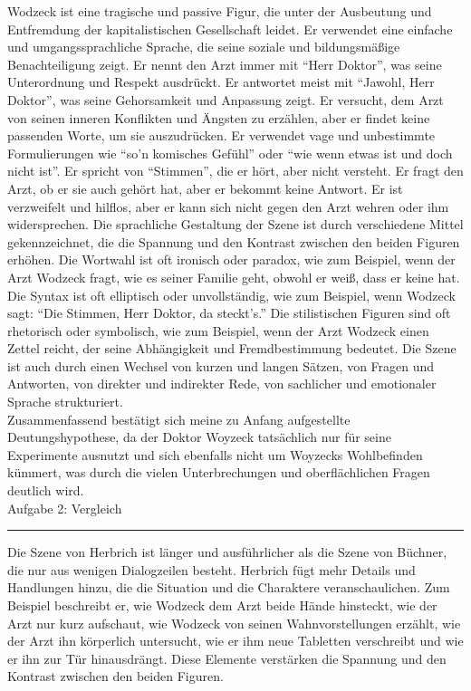 \documentclass[a4paper,12pt]{report}
\begin{document}
	Wodzeck ist eine tragische und passive Figur, die unter der Ausbeutung und Entfremdung der kapitalistischen Gesellschaft leidet.
	Er verwendet eine einfache und umgangssprachliche Sprache, die seine soziale und bildungsmäßige Benachteiligung zeigt.
	Er nennt den Arzt immer mit “Herr Doktor”, was seine Unterordnung und Respekt ausdrückt.
	Er antwortet meist mit “Jawohl, Herr Doktor”, was seine Gehorsamkeit und Anpassung zeigt.
	Er versucht, dem Arzt von seinen inneren Konflikten und Ängsten zu erzählen, aber er findet keine passenden Worte, um sie auszudrücken.
	Er verwendet vage und unbestimmte Formulierungen wie “so’n komisches Gefühl” oder “wie wenn etwas ist und doch nicht ist”.
	Er spricht von “Stimmen”, die er hört, aber nicht versteht.
	Er fragt den Arzt, ob er sie auch gehört hat, aber er bekommt keine Antwort.
	Er ist verzweifelt und hilflos, aber er kann sich nicht gegen den Arzt wehren oder ihm widersprechen.
	Die sprachliche Gestaltung der Szene ist durch verschiedene Mittel gekennzeichnet, die die Spannung und den Kontrast zwischen den beiden Figuren erhöhen.
	Die Wortwahl ist oft ironisch oder paradox, wie zum Beispiel, wenn der Arzt Wodzeck fragt, wie es seiner Familie geht, obwohl er weiß, dass er keine hat.
	Die Syntax ist oft elliptisch oder unvollständig, wie zum Beispiel, wenn Wodzeck sagt: “Die Stimmen, Herr Doktor, da steckt’s.”
	Die stilistischen Figuren sind oft rhetorisch oder symbolisch, wie zum Beispiel, wenn der Arzt Wodzeck einen Zettel reicht, der seine Abhängigkeit und Fremdbestimmung bedeutet.
	Die Szene ist auch durch einen Wechsel von kurzen und langen Sätzen, von Fragen und Antworten, von direkter und indirekter Rede, von sachlicher und emotionaler Sprache strukturiert.
	\\
	Zusammenfassend bestätigt sich meine zu Anfang aufgestellte Deutungshypothese, da der Doktor Woyzeck tatsächlich nur für seine Experimente ausnutzt und sich ebenfalls nicht um Woyzecks Wohlbefinden kümmert, was durch die vielen Unterbrechungen und oberflächlichen Fragen deutlich wird.
	\\[2cm]
	\Large
	Aufgabe 2: Vergleich
	\hrule
	\vspace{0.5cm}
	\noindent
	\large
	Die Szene von Herbrich ist länger und ausführlicher als die Szene von Büchner, die nur aus wenigen Dialogzeilen besteht. Herbrich fügt mehr Details und Handlungen hinzu, die die Situation und die Charaktere veranschaulichen. Zum Beispiel beschreibt er, wie Wodzeck dem Arzt beide Hände hinsteckt, wie der Arzt nur kurz aufschaut, wie Wodzeck von seinen Wahnvorstellungen erzählt, wie der Arzt ihn körperlich untersucht, wie er ihm neue Tabletten verschreibt und wie er ihn zur Tür hinausdrängt. Diese Elemente verstärken die Spannung und den Kontrast zwischen den beiden Figuren.
\end{document}
